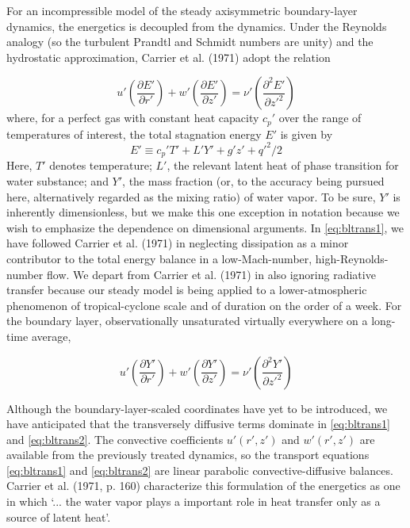 \documentclass[preprint, prX]{revtex4}
\newcommand{\ppd}[2]{\left(\frac{\partial#1}{\partial#2}\right)}
\begin{document}
For an incompressible model of the steady axisymmetric boundary-layer dynamics, the energetics is decoupled from the dynamics. Under the Reynolds analogy (so the turbulent Prandtl and Schmidt numbers are unity) and the hydrostatic approximation, Carrier et al. (1971) adopt the relation

\begin{equation}
u' \ppd{E'}{r'} + w' \ppd{E'}{z'} = \nu'\left( \frac{\partial^2 E'}{\partial z'^2}\right )
\label{eq:bltrans1}
\end{equation}
where, for a perfect gas with constant heat capacity $c_p'$ over the range of temperatures of interest, the total stagnation energy $E'$ is given by
\begin{equation}
E'\equiv c_p'T'+L'Y' + g'z' + q'^2 /2
\label{eq:blestag}
\end{equation}
Here, $T'$ denotes temperature; $L'$, the relevant latent heat of phase transition for water substance; and $Y'$, the mass fraction (or, to the accuracy being pursued here, alternatively regarded as the mixing ratio) of water vapor. To be sure, $Y'$ is inherently dimensionless, but we make this one exception in notation because we wish to emphasize the dependence on dimensional arguments. In \eqref{eq:bltrans1}, we have followed Carrier et al. (1971) in neglecting dissipation as a minor contributor to the total energy balance in a low-Mach-number, high-Reynolds-number flow. We depart from Carrier et al. (1971) in also ignoring radiative transfer because our steady model is being applied to a lower-atmospheric phenomenon of tropical-cyclone scale and of duration on the order of a week. For the boundary layer, observationally unsaturated virtually everywhere on a long-time average,

\begin{equation}
u' \ppd{Y'}{r'} + w'\ppd{Y'}{z'} = \nu'\left( \frac{\partial^2 Y'}{\partial z'^2}\right )
\label{eq:bltrans2}
\end{equation}

Although the boundary-layer-scaled coordinates have yet to be introduced, we have anticipated that the transversely diffusive terms dominate in \eqref{eq:bltrans1} and \eqref{eq:bltrans2}. The convective coefficients $u'(r', z')$ and $w'(r', z')$ are available from the previously treated dynamics, so the transport equations \eqref{eq:bltrans1} and \eqref{eq:bltrans2} are linear parabolic convective-diffusive balances. Carrier et al. (1971, p. 160) characterize this formulation of the energetics as one in which `... the water vapor plays a important role in heat transfer only as a source of latent heat'.
\end{document}
